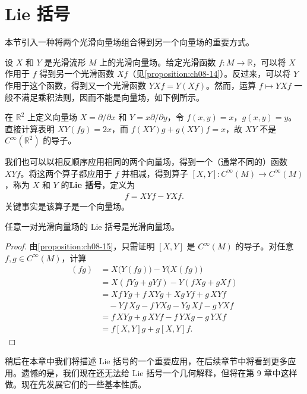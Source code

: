 \documentclass[../../main.tex]{subfiles}
\begin{document}
\section{Lie 括号}\label{section:ch08-Lie括号}

本节引入一种将两个光滑向量场组合得到另一个向量场的重要方式。

设 $X$ 和 $Y$ 是光滑流形 $M$ 上的光滑向量场。给定光滑函数 $f\colon M\to\mathbb{R}$，可以将 $X$ 作用于 $f$ 得到另一个光滑函数 $Xf$（见\cref{proposition:ch08-14}）。反过来，可以将 $Y$ 作用于这个函数，得到又一个光滑函数 $YXf=Y(Xf)$。然而，运算 $f\mapsto YXf$ 一般不满足乘积法则，因而不能是向量场，如下例所示。

\begin{example}\label{example:ch08-24}
在 $\mathbb{R}^2$ 上定义向量场 $X=\partial/\partial x$ 和 $Y=x\partial/\partial y$，令 $f(x,y)=x$，$g(x,y)=y$。直接计算表明 $XY(fg)=2x$，而 $f(XY)g+g(XY)f=x$，故 $XY$ 不是 $C^\infty(\mathbb{R}^2)$ 的导子。
\end{example}

我们也可以以相反顺序应用相同的两个向量场，得到一个（通常不同的）函数 $XYf$。将这两个算子都应用于 $f$ 并相减，得到算子 $[X,Y]\colon C^\infty(M)\to C^\infty(M)$，称为 $X$ 和 $Y$ 的\textbf{Lie 括号}，定义为
\begin{align*}
[X,Y]f=XYf-YXf.
\end{align*}
关键事实是该算子是一个向量场。

\begin{lemma}\label{lemma:ch08-25}
任意一对光滑向量场的 Lie 括号是光滑向量场。
\end{lemma}

\begin{proof}
由\cref{proposition:ch08-15}，只需证明 $[X,Y]$ 是 $C^\infty(M)$ 的导子。对任意 $f,g\in C^\infty(M)$，计算
\begin{align*}
[X,Y](fg)&=X\bigl(Y(fg)\bigr)-Y\bigl(X(fg)\bigr)\\
&=X(fYg+gYf)-Y(fXg+gXf)\\
&=Xf\,Yg+f\,XYg+Xg\,Yf+g\,XYf\\
&\quad -Yf\,Xg-f\,YXg-Yg\,Xf-g\,YXf\\
&=f\,XYg+g\,XYf-f\,YXg-g\,YXf\\
&=f[X,Y]g+g[X,Y]f.
\end{align*}
\end{proof}

稍后在本章中我们将描述 Lie 括号的一个重要应用，在后续章节中将看到更多应用。遗憾的是，我们现在还无法给 Lie 括号一个几何解释，但将在第 9 章中这样做。现在先发展它们的一些基本性质。
\end{document}
